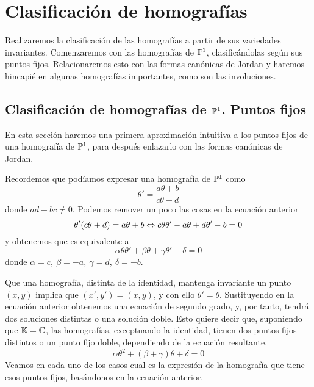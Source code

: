 \chapter{Clasificación de homografías}
Realizaremos la clasificación de las homografías a partir de sus variedades invariantes. Comenzaremos con las homografías de $\mathbb{P}^1$, clasificándolas según sus puntos fijos. Relacionaremos esto con las formas canónicas de Jordan y haremos hincapié en algunas homografías importantes, como son las involuciones.

\section{Clasificación de homografías de $\mathbb{P}^1$. Puntos fijos}
En esta sección haremos una primera aproximación intuitiva a los puntos fijos de una homografía de $\mathbb{P}^1$, para después enlazarlo con las formas canónicas de Jordan.

Recordemos que podíamos expresar una homografía de $\mathbb{P}^1$ como
\begin{equation}
	\label{C6_transformada_moebius}
	\theta'=\frac{a\theta+b}{c\theta +d}
\end{equation}
donde $ad-bc\not=0$. Podemos remover un poco las cosas en la ecuación anterior
\begin{equation}
	\theta'(c\theta+d)=a\theta+b\Leftrightarrow c\theta\theta'-a\theta+d\theta'-b=0
\end{equation}
y obtenemos que es equivalente a 
\begin{equation}
	\label{C6_eq_homografia_segundo_orden}
	\alpha\theta\theta'+\beta\theta+\gamma\theta'+\delta=0
\end{equation}
donde $\alpha=c, \ \beta=-a, \ \gamma=d, \ \delta=-b$. 

Que una homografía, distinta de la identidad, mantenga invariante un punto $(x,y)$ implica que $(x',y')=(x,y)$, y con ello $\theta'=\theta$. Sustituyendo en la ecuación anterior obtenemos una ecuación de segundo grado, y, por tanto, tendrá dos soluciones distintas o una solución doble. Esto quiere decir que, suponiendo que $\mathbb{K}=\mathbb{C}$, las homografías, exceptuando la identidad, tienen dos puntos fijos distintos o un punto fijo doble, dependiendo de la ecuación resultante.
\begin{equation}
	\label{C6_eq_homografia_segundo_orden_punto_fijo}
	\alpha\theta^2+(\beta+\gamma)\theta+\delta=0
\end{equation}
Veamos en cada uno de los casos cual es la expresión de la homografía que tiene esos puntos fijos, basándonos en la ecuación anterior.

